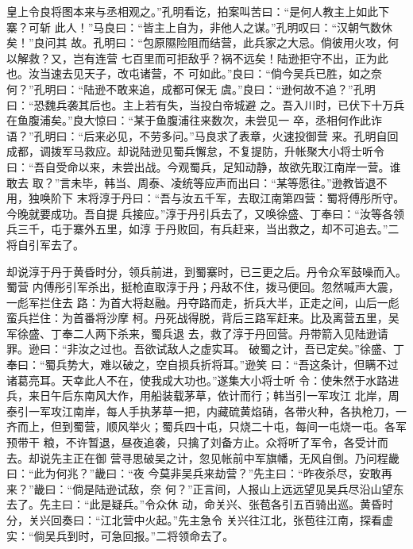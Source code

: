 皇上令良将图本来与丞相观之。”孔明看讫，拍案叫苦曰：“是何人教主上如此下寨？可斩
此人！”马良曰：“皆主上自为，非他人之谋。”孔明叹曰：“汉朝气数休矣！”良问其
故。孔明曰：“包原隰险阻而结营，此兵家之大忌。倘彼用火攻，何以解救？又，岂有连营
七百里而可拒敌乎？祸不远矣！陆逊拒守不出，正为此也。汝当速去见天子，改屯诸营，不
可如此。”良曰：“倘今吴兵已胜，如之奈何？”孔明曰：“陆逊不敢来追，成都可保无
虞。”良曰：“逊何故不追？”孔明曰：“恐魏兵袭其后也。主上若有失，当投白帝城避
之。吾入川时，已伏下十万兵在鱼腹浦矣。”良大惊曰：“某于鱼腹浦往来数次，未尝见一
卒，丞相何作此诈语？”孔明曰：“后来必见，不劳多问。”马良求了表章，火速投御营
来。孔明自回成都，调拨军马救应。却说陆逊见蜀兵懈怠，不复提防，升帐聚大小将士听令
曰：“吾自受命以来，未尝出战。今观蜀兵，足知动静，故欲先取江南岸一营。谁敢去
取？”言未毕，韩当、周泰、凌统等应声而出曰：“某等愿往。”逊教皆退不用，独唤阶下
末将淳于丹曰：“吾与汝五千军，去取江南第四营：蜀将傅彤所守。今晚就要成功。吾自提
兵接应。”淳于丹引兵去了，又唤徐盛、丁奉曰：“汝等各领兵三千，屯于寨外五里，如淳
于丹败回，有兵赶来，当出救之，却不可追去。”二将自引军去了。

却说淳于丹于黄昏时分，领兵前进，到蜀寨时，已三更之后。丹令众军鼓噪而入。蜀营
内傅彤引军杀出，挺枪直取淳于丹；丹敌不住，拨马便回。忽然喊声大震，一彪军拦住去
路：为首大将赵融。丹夺路而走，折兵大半，正走之间，山后一彪蛮兵拦住：为首番将沙摩
柯。丹死战得脱，背后三路军赶来。比及离营五里，吴军徐盛、丁奉二人两下杀来，蜀兵退
去，救了淳于丹回营。丹带箭入见陆逊请罪。逊曰：“非汝之过也。吾欲试敌人之虚实耳。
破蜀之计，吾已定矣。”徐盛、丁奉曰：“蜀兵势大，难以破之，空自损兵折将耳。”逊笑
曰：“吾这条计，但瞒不过诸葛亮耳。天幸此人不在，使我成大功也。”遂集大小将士听
令：使朱然于水路进兵，来日午后东南风大作，用船装载茅草，依计而行；韩当引一军攻江
北岸，周泰引一军攻江南岸，每人手执茅草一把，内藏硫黄焰硝，各带火种，各执枪刀，一
齐而上，但到蜀营，顺风举火；蜀兵四十屯，只烧二十屯，每间一屯烧一屯。各军预带干
粮，不许暂退，昼夜追袭，只擒了刘备方止。众将听了军令，各受计而去。却说先主正在御
营寻思破吴之计，忽见帐前中军旗幡，无风自倒。乃问程畿曰：“此为何兆？”畿曰：“夜
今莫非吴兵来劫营？”先主曰：“昨夜杀尽，安敢再来？”畿曰：“倘是陆逊试敌，奈
何？”正言间，人报山上远远望见吴兵尽沿山望东去了。先主曰：“此是疑兵。”令众休
动，命关兴、张苞各引五百骑出巡。黄昏时分，关兴回奏曰：“江北营中火起。”先主急令
关兴往江北，张苞往江南，探看虚实：“倘吴兵到时，可急回报。”二将领命去了。


